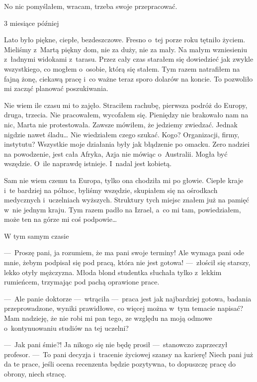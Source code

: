 No nic pomyślałem, wracam, trzeba swoje przepracować.

\begin{paratitle}
3 miesiące później
\end{paratitle}

Lato było piękne, ciepłe, bezdeszczowe. Fresno o~tej porze roku tętniło życiem. Mieliśmy z~Martą piękny dom, nie za duży, nie za mały. Na małym wzniesieniu z~ładnymi widokami z~tarasu. Przez cały czas starałem się dowiedzieć jak zwykle wszystkiego, co mogłem o~osobie, którą się stałem. Tym razem natrafiłem na fajną żonę, ciekawą pracę i~co ważne teraz sporo dolarów na koncie. To pozwoliło mi zacząć planować poszukiwania.

\paraSep

Nie wiem ile czasu mi to zajęło. Straciłem rachubę, pierwsza podróż do Europy, druga, trzecia. Nie pracowałem, wycofałem się. Pieniędzy nie brakowało nam na nic, Marta nie protestowała. Zawsze mówiłem, że jedziemy zwiedzać. Jednak nigdzie nawet śladu… Nie wiedziałem czego szukać. Kogo? Organizacji, firmy, instytutu? Wszystkie moje działania były jak błądzenie po omacku. Zero nadziei na powodzenie, jest cała Afryka, Azja nie mówiąc o~Australii. Mogła być wszędzie. O~ile naprawdę istnieje. I~nadal jest kobietą.

\paraSep

Sam nie wiem czemu ta Europa, tylko ona chodziła mi po głowie. Ciepłe kraje i~te bardziej na północ, byliśmy wszędzie, skupiałem się na ośrodkach medycznych i~uczelniach wyższych. Struktury tych miejsc znałem już na pamięć w~nie jednym kraju. Tym razem padło na Izrael, a~co mi tam, powiedziałem, może ten na górze mi coś podpowie…

\begin{paratitle}
W tym samym czasie
\end{paratitle}

---~Proszę pani, ja rozumiem, że ma pani swoje terminy! Ale wymaga pani ode mnie, żebym podpisał się pod pracą, która nie jest gotowa! ---~złościł się starszy, lekko otyły mężczyzna. Młoda blond studentka słuchała tylko z~lekkim rumieńcem, trzymając pod pachą oprawione prace. 

---~Ale panie doktorze ---~wtrąciła ---~praca jest jak najbardziej gotowa, badania przeprowadzone, wyniki prawidłowe, co więcej można w~tym temacie napisać? Mam nadzieję, że nie robi mi pan tego, ze względu na moją odmowe o~kontynuowaniu studiów na tej uczelni?

---~Jak pani śmie?! Ja nikogo się nie będę prosił ---~stanowczo zaprzeczył profesor. ---~To pani decyzja i~tracenie życiowej szansy na karierę! Niech pani już da te prace, jeśli ocena recenzenta będzie pozytywna, to dopuszczę pracę do obrony, niech stracę.

